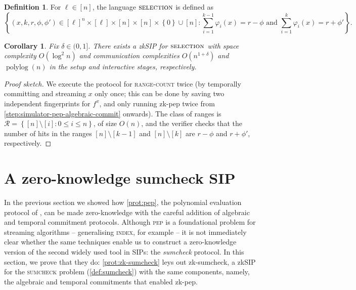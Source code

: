 \documentclass[a4paper,UKenglish,cleveref, autoref, thm-restate]{lipics-v2021}
\newtheorem{corollary}[theorem]{Corollary}
\theoremstyle{definition}
\newtheorem{definition}[theorem]{Definition}
\newcommand{\zksip}{\textrm{zkSIP}}
\renewcommand{\set}[1]{\left\{#1\right\}}
\newcommand{\polylog}{\operatorname{polylog}}
\newcommand{\indexproblem}{\normalfont\textsc{index}\xspace}
\newcommand{\pep}{\normalfont\textsc{pep}\xspace}
\newcommand{\sumcheck}{\normalfont\textsc{sumcheck}\xspace}
\newcommand{\rangecount}{\normalfont\textsc{range-count}\xspace}
\newcommand{\selection}{\normalfont\textsc{selection}\xspace}
\begin{document}
\begin{definition}
  \label{def:selection}
  For $\ell \in [n]$, the language $\selection$ is defined as
  \begin{equation*}
      \set{(x, k, r, \phi, \phi') \in [\ell]^n \times [\ell] \times [n] \times [n] \times \set{0} \cup [n] : \sum_{i = 1}^{k-1} \varphi_i(x) = r - \phi \text{ and } \sum_{i = 1}^k \varphi_i(x) = r + \phi'}.
  \end{equation*}
\end{definition}
\begin{corollary}
    \label{cor:selection}
    Fix $\delta \in (0,1]$. There exists a \zksip{} for $\selection$ with space complexity $O(\log^2 n)$ and communication complexities $O(n^{1 + \delta})$ and $\polylog(n)$ in the setup and interactive stages, respectively.
\end{corollary}
\begin{proof}[Proof sketch]
    We execute the protocol for \rangecount twice (by temporally committing and streaming $x$ only once; this can be done by saving two independent fingerprints for $f^x$, and only running \textsf{zk-pep} twice from \cref{step:simulator-pep-algebraic-commit} onwards). The class of ranges is $\mathcal{R} = \set{[n] \setminus [i] : 0 \leq i \leq n}$, of size $O(n)$, and the verifier checks that the number of hits in the ranges $[n] \setminus [k - 1]$ and $[n] \setminus [k]$ are $r - \phi$ and $r + \phi'$, respectively.
\end{proof}

\section{A zero-knowledge sumcheck SIP}
\label{sec:sumcheck}

In the previous section we showed how \cref{prot:pep}, the polynomial evaluation protocol of \cite{CTY11}, can be made zero-knowledge with the careful addition of algebraic and temporal commitment protocols. Although \pep is a foundational problem for streaming algorithms -- generalising \indexproblem, for example -- it is not immediately clear whether the same techniques enable us to construct a zero-knowledge version of the second widely used tool in SIPs: the \emph{sumcheck} protocol. In this section, we prove that they do: \cref{prot:zk-sumcheck} leys out \textsf{zk-sumcheck}, a \zksip{} for the \sumcheck problem (\cref{def:sumcheck}) with the same components, namely, the algebraic and temporal commitments that enabled \textsf{zk-pep}.
\end{document}

